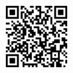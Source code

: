 \documentclass[11 pt,oneside,a4paper,titlepage]{article}
\begin{document}
{\begin{minipage}{7.3cm}
        \hfill \break
        \begin{center}
            \includegraphics[width=3.5cm]{qr-Git.png}
        \end{center}
       
        \end{minipage}}
        \hfill 
\end{document}
